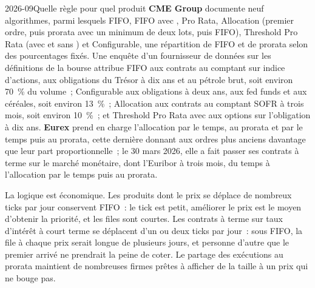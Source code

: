 \begin{dated}{2026-09}{Quelle règle pour quel produit}\label{dat:m1:matching-algorithms-and-implied-spreads:which}
\textbf{CME Group} documente neuf algorithmes, parmi lesquels FIFO, FIFO avec
, Pro Rata, Allocation (premier ordre, puis prorata avec un
minimum de deux lots, puis FIFO), Threshold Pro Rata (avec et sans ) et Configurable, une répartition de FIFO et de prorata selon des
pourcentages fixés. Une enquête d'un fournisseur de données sur les définitions de la bourse attribue
FIFO aux contrats au comptant sur indice d'actions, aux obligations du Trésor à dix ans et au pétrole brut, soit environ 70~\%
du volume~; Configurable aux obligations à deux ans, aux fed funds et aux céréales,
soit environ 13~\%~; Allocation aux contrats au comptant SOFR à trois mois, soit environ 10~\%~; et
Threshold Pro Rata avec  aux options sur l'obligation à dix ans.
\textbf{Eurex} prend en charge l'allocation par le temps, au prorata et par le temps puis au prorata, cette dernière
donnant aux ordres plus anciens davantage que leur part proportionnelle~; le 30 mars 2026, elle a
fait passer ses contrats à terme sur le marché monétaire, dont l'Euribor à trois mois, du
temps à l'allocation par le temps puis au prorata.
\end{dated}

La logique est économique. Les produits dont le prix se déplace de nombreux ticks par jour conservent
FIFO~: le tick est petit, améliorer le prix est le moyen d'obtenir la priorité, et les
files sont courtes. Les contrats à terme sur taux d'intérêt à court terme se déplacent d'un ou deux ticks par jour~:
sous FIFO, la file à chaque prix serait longue de plusieurs jours, et personne d'autre
que le premier arrivé ne prendrait la peine de coter. Le partage des exécutions au prorata
maintient de nombreuses firmes prêtes à afficher de la taille à un prix qui ne bouge pas.

